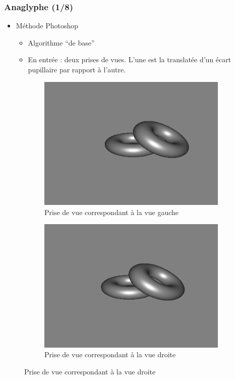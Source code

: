 \documentclass{beamer}
\begin{document}

%

\begin{frame}
\frametitle{Anaglyphe (1/8)}
\begin{itemize}[label=$\bullet$]
\item Méthode Photoshop \cite{stereoAnaglyph}
	\begin{itemize}[label=$\circ$]
	\item Algorithme ``de base''
	\item En entrée : deux prises de vues. L'une est la translatée d'un écart pupillaire par rapport à l'autre.
	\end{itemize}
\end{itemize}

\begin{figure}
\centering
\caption{Les deux prises de vue obtenues avec translation}
\begin{subfigure}{.5\textwidth}
  \centering
  \includegraphics[width=.8\linewidth]{gauche.png}
  \caption{Prise de vue correspondant à la vue gauche}
\end{subfigure}%
\begin{subfigure}{.5\textwidth}
  \centering
  \includegraphics[width=.8\linewidth]{droite.png}
  \caption{Prise de vue correspondant à la vue droite}
\end{subfigure}
\end{figure}

	\end{frame}
\end{document}
